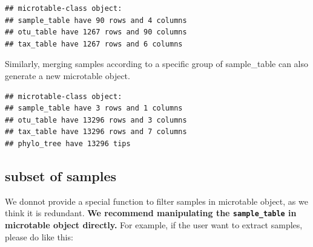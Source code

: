 \documentclass[
]{book}
\newenvironment{Shaded}{\begin{snugshade}}{\end{snugshade}}
\newcommand{\CommentTok}[1]{\textcolor[rgb]{0.56,0.35,0.01}{\textit{#1}}}
\newcommand{\FunctionTok}[1]{\textcolor[rgb]{0.13,0.29,0.53}{\textbf{#1}}}
\newcommand{\NormalTok}[1]{#1}
\newcommand{\OtherTok}[1]{\textcolor[rgb]{0.56,0.35,0.01}{#1}}
\newcommand{\SpecialCharTok}[1]{\textcolor[rgb]{0.81,0.36,0.00}{\textbf{#1}}}
\newcommand{\StringTok}[1]{\textcolor[rgb]{0.31,0.60,0.02}{#1}}
\begin{document}
\begin{verbatim}
## microtable-class object:
## sample_table have 90 rows and 4 columns
## otu_table have 1267 rows and 90 columns
## tax_table have 1267 rows and 6 columns
\end{verbatim}

Similarly, merging samples according to a specific group of sample\_table can also generate a new microtable object.

\begin{Shaded}
\end{Shaded}

\begin{verbatim}
## microtable-class object:
## sample_table have 3 rows and 1 columns
## otu_table have 13296 rows and 3 columns
## tax_table have 13296 rows and 7 columns
## phylo_tree have 13296 tips
\end{verbatim}

\subsection{subset of samples}\label{subset-of-samples}

We donnot provide a special function to filter samples in microtable object, as we think it is redundant.
\textbf{We recommend manipulating the \texttt{sample\_table} in microtable object directly.}
For example, if the user want to extract samples, please do like this:

\begin{Shaded}
\end{Shaded}
\end{document}

